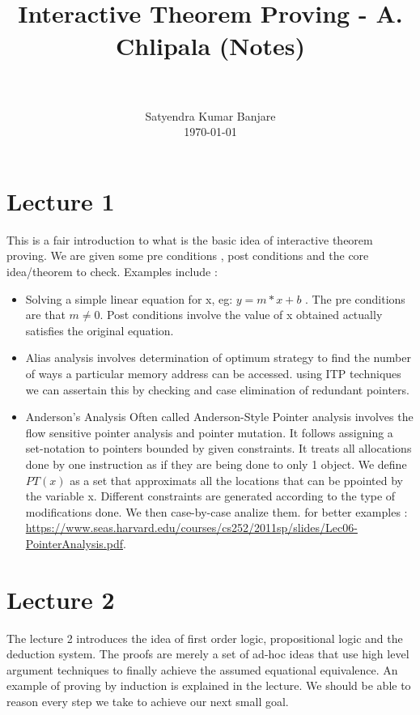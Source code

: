 \documentclass[paper=a4, fontsize=11pt]{scrartcl}
\title{
		\usefont{OT1}{bch}{b}{n}
		\horrule{0.5pt} \\[0.4cm]
		\normalsize Interactive Theorem Proving - A. Chlipala (Notes) \\
		\horrule{2pt} \\[0.5cm]
}
\author{
		\normalfont 								\normalsize
        Satyendra Kumar Banjare\\[-3pt]		\normalsize
        \today
}
\date{}
\numberwithin{equation}{section}		%
\numberwithin{figure}{section}			%
\numberwithin{table}{section}				%
\begin{document}
\maketitle
\section{Lecture 1}
This is a fair introduction to what is the basic idea of interactive theorem proving. We are given some pre conditions 	, post conditions and the core idea/theorem to check. Examples include :
\begin{itemize}
	\item{
		Solving a  simple linear equation for x, eg: $ y = m*x +b $ . The pre conditions are that $m \neq 0 $. Post conditions involve the value of x obtained actually satisfies the original equation. 
	}
	\item{Alias analysis involves determination of optimum strategy to find the number of ways a particular memory address can be accessed. using ITP techniques we can assertain this by checking and case elimination of redundant pointers. 
	}

	\item{Anderson's Analysis}
Often called Anderson-Style Pointer analysis involves the flow sensitive pointer analysis and pointer mutation. It follows assigning a set-notation to pointers bounded by given constraints. It treats all allocations done by one instruction as if they are being done to only 1 object. We define $PT(x)$ as a set that approximats all the locations that can be ppointed by the variable x. Different constraints are generated according to the type of modifications done. We then case-by-case analize them. for better examples : \url{https://www.seas.harvard.edu/courses/cs252/2011sp/slides/Lec06-PointerAnalysis.pdf}. 

\end{itemize}

\section{Lecture 2}
The lecture 2 introduces the idea of first order logic, propositional logic and the deduction system. The proofs are merely a set of ad-hoc ideas that use high level argument techniques to finally achieve the assumed equational equivalence. An example of proving by induction is explained in the lecture. We should be able to reason every step we take to achieve our next small goal. 
\end{document}
